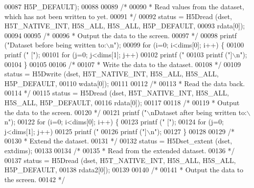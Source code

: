 \begin{DoxyCode}
00087                 H5P\_DEFAULT);
00088 
00089     \textcolor{comment}{/*}
00090 \textcolor{comment}{     * Read values from the dataset, which has not been written to yet.}
00091 \textcolor{comment}{     */}
00092     status = H5Dread (dset, H5T\_NATIVE\_INT, H5S\_ALL, H5S\_ALL, H5P\_DEFAULT,
00093                 rdata[0]);
00094 
00095     \textcolor{comment}{/*}
00096 \textcolor{comment}{     * Output the data to the screen.}
00097 \textcolor{comment}{     */}
00098     printf (\textcolor{stringliteral}{"Dataset before being written to:\(\backslash\)n"});
00099     \textcolor{keywordflow}{for} (i=0; i<dims[0]; i++) \{
00100         printf (\textcolor{stringliteral}{" ["});
00101         \textcolor{keywordflow}{for} (j=0; j<dims[1]; j++)
00102             printf (\textcolor{stringliteral}{" %
00103         printf (\textcolor{stringliteral}{"]\(\backslash\)n"});
00104     \}
00105 
00106     \textcolor{comment}{/*}
00107 \textcolor{comment}{     * Write the data to the dataset.}
00108 \textcolor{comment}{     */}
00109     status = H5Dwrite (dset, H5T\_NATIVE\_INT, H5S\_ALL, H5S\_ALL, H5P\_DEFAULT,
00110                 wdata[0]);
00111 
00112     \textcolor{comment}{/*}
00113 \textcolor{comment}{     * Read the data back.}
00114 \textcolor{comment}{     */}
00115     status = H5Dread (dset, H5T\_NATIVE\_INT, H5S\_ALL, H5S\_ALL, H5P\_DEFAULT,
00116                 rdata[0]);
00117 
00118     \textcolor{comment}{/*}
00119 \textcolor{comment}{     * Output the data to the screen.}
00120 \textcolor{comment}{     */}
00121     printf (\textcolor{stringliteral}{"\(\backslash\)nDataset after being written to:\(\backslash\)n"});
00122     \textcolor{keywordflow}{for} (i=0; i<dims[0]; i++) \{
00123         printf (\textcolor{stringliteral}{" ["});
00124         \textcolor{keywordflow}{for} (j=0; j<dims[1]; j++)
00125             printf (\textcolor{stringliteral}{" %
00126         printf (\textcolor{stringliteral}{"]\(\backslash\)n"});
00127     \}
00128 
00129     \textcolor{comment}{/*}
00130 \textcolor{comment}{     * Extend the dataset.}
00131 \textcolor{comment}{     */}
00132     status = H5Dset\_extent (dset, extdims);
00133 
00134     \textcolor{comment}{/*}
00135 \textcolor{comment}{     * Read from the extended dataset.}
00136 \textcolor{comment}{     */}
00137     status = H5Dread (dset, H5T\_NATIVE\_INT, H5S\_ALL, H5S\_ALL, H5P\_DEFAULT,
00138                 rdata2[0]);
00139 
00140     \textcolor{comment}{/*}
00141 \textcolor{comment}{     * Output the data to the screen.}
00142 \textcolor{comment}{     */}
}}
\end{DoxyCode}
